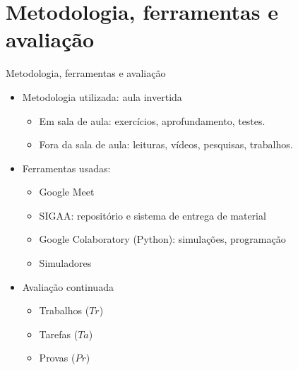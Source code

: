     \section[ slide = true]{Metodologia, ferramentas e avaliação}
      \begin{slide}[toc=]{Metodologia, ferramentas e avaliação}
         \begin{itemize}
	    \item Metodologia utilizada: aula invertida  
		    \begin{itemize}
			    \item Em sala de aula: exercícios, aprofundamento, testes.
			    \item Fora da sala de aula: leituras, vídeos, pesquisas, trabalhos. 
		    \end{itemize}
	    \item Ferramentas usadas:
		    \begin{itemize}
			    \item Google Meet %
			    \item SIGAA: repositório e sistema de entrega de material
			    \item Google Colaboratory (Python): simulações, programação 
			    \item Simuladores
		    \end{itemize}

            \item Avaliação continuada
            \begin{itemize}
		    \item Trabalhos ($Tr$) 
		    \item Tarefas ($Ta$)
		    \item Provas ($Pr$)
	    \end{itemize}
	 \end{itemize}
      \end{slide}
      
